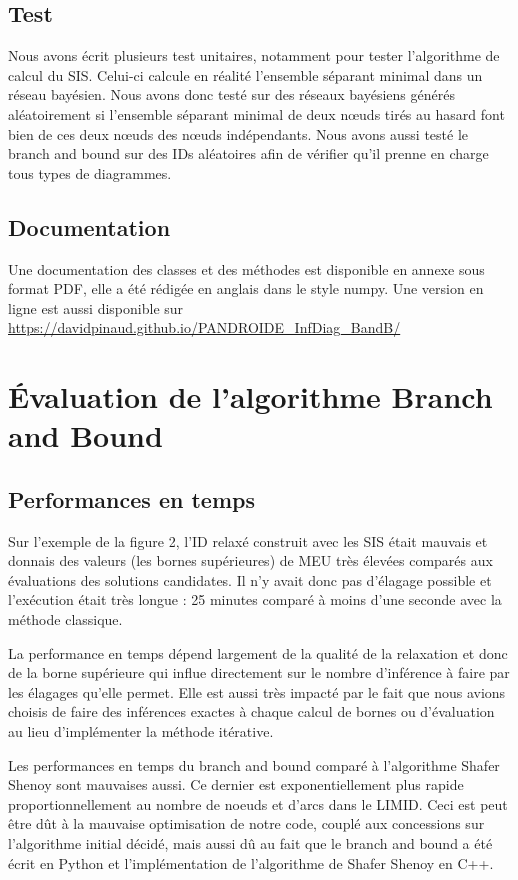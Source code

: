 \documentclass[12pt]{article}
\begin{document}
\subsection{Test}
Nous avons écrit plusieurs test unitaires, notamment pour tester l'algorithme de calcul du SIS. Celui-ci calcule en réalité l'ensemble séparant minimal dans un réseau bayésien. Nous avons donc testé sur des réseaux bayésiens générés aléatoirement si l'ensemble séparant minimal de deux nœuds tirés au hasard font bien de ces deux nœuds des nœuds indépendants. Nous avons aussi testé le branch and bound sur des IDs aléatoires afin de vérifier qu'il prenne en charge tous types de diagrammes.

\subsection{Documentation}
Une documentation des classes et des méthodes est disponible en annexe sous format PDF, elle a été rédigée en anglais dans le style numpy. Une version en ligne est aussi disponible sur \url{https://davidpinaud.github.io/PANDROIDE_InfDiag_BandB/}
\section{Évaluation de l'algorithme Branch and Bound}
\subsection{Performances en temps}
Sur l'exemple de la figure 2, l'ID relaxé construit avec les SIS était mauvais et donnais des valeurs (les bornes supérieures) de MEU très élevées comparés aux évaluations des solutions candidates. Il n'y avait donc pas d'élagage possible et l'exécution était très longue : 25 minutes comparé à moins d'une seconde avec la méthode classique.

La performance en temps dépend largement de la qualité de la relaxation et donc de la borne supérieure qui influe directement sur le nombre d'inférence à faire par les élagages qu'elle permet. Elle est aussi très impacté par le fait que nous avions choisis de faire des inférences exactes à chaque calcul de bornes ou d'évaluation au lieu d'implémenter la méthode itérative.

Les performances en temps du branch and bound comparé à l'algorithme Shafer Shenoy sont mauvaises aussi. Ce dernier est exponentiellement plus rapide proportionnellement au nombre de noeuds et d'arcs dans le LIMID. Ceci est peut être dût à la mauvaise optimisation de notre code, couplé aux concessions sur l'algorithme initial décidé, mais aussi dû au fait que le branch and bound a été écrit en Python et l'implémentation de l'algorithme de Shafer Shenoy en C++.
\end{document}
